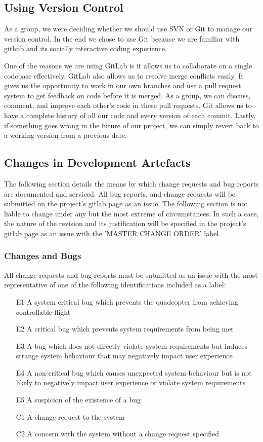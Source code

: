 \documentclass[10pt,letterpaper]{article}
\begin{document}
\subsection{Using Version Control}
As a group, we were deciding whether we should use SVN or Git to manage our version control. In the end we chose to use Git because we are familiar with github and its socially interactive coding experience. \par 
One of the reasons we are using GitLab is it allows us to collaborate on a single codebase effectively. GitLab also allows us to resolve merge conflicts easily. It gives us the opportunity to work in our own branches and use a pull request system to get feedback on code before it is merged. As a group, we can discuss, comment, and improve each other's code in these pull requests. Git allows us to have a complete history of all our code and every version of each commit. Lastly, if something goes wrong in the future of our project, we can simply revert back to a working version from a previous date.

\subsection{Changes in Development Artefacts}
The following section details the means by which change requests and bug reports are documented and serviced. All bug reports, and change requests will be submitted on the project's gitlab page as an issue. The following section is not liable to change under any but the most extreme of circumstances. In such a case, the nature of the revision and its justification will be specified in the project's gitlab page as an issue with the 'MASTER CHANGE ORDER' label.

\subsubsection{Changes and Bugs}
All change requests and bug reports must be submitted as an issue with the most representative of one of the following identifications included as a label:

\begin{enumerate}
	\item[E1] A system critical bug which prevents the quadcopter from achieving controllable flight
	\item[E2] A critical bug which prevents system requirements from being met
	\item[E3] A bug which does not directly violate system requirements but induces strange system behaviour that may negatively impact user experience
	\item[E4] A non-critical bug which causes unexpected system behaviour but is not likely to negatively impact user experience or violate system requirements
	\item[E5] A suspicion of the existence of a bug
	\item[C1] A change request to the system
	\item[C2] A concern with the system without a change request specified 
\end{enumerate}
\end{document}
